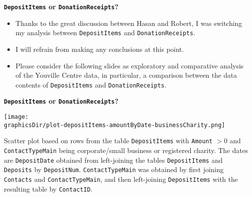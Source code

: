 
\begin{frame}{\bf\texttt{DepositItems} or \texttt{DonationReceipts}?}
\normalsize
\vskip 0.5cm

\begin{itemize}
\item	Thanks to the great discussion between Hasan and Robert, I was switching my analysis
	between \texttt{DepositItems} and \texttt{DonationReceipts}.

\vskip 0.5cm
\item	I will refrain from making any conclusions at this point.

\vskip 0.5cm
\item	Please consider the following slides as exploratory and comparative analysis of
	the Youville Centre data, in particular, a comparison between the data contents
	of \texttt{DepositItems} and \texttt{DonationReceipts}.

\end{itemize}
\end{frame}

\begin{frame}{\bf\texttt{DepositItems} or \texttt{DonationReceipts}?}
\tiny

\vskip 0.8cm
\begin{center}
\texttt{[image: \\graphicsDir/plot-depositItems-amountByDate-businessCharity.png]}
\end{center}

\begin{flushleft}
Scatter plot based on rows from the table \texttt{DepositItems} with {\color{red}\texttt{Amount} $> 0$}
and \texttt{ContactTypeMain} being corporate/small business or registered charity.
The dates are \texttt{DepositDate} obtained from left-joining the tables \texttt{DepositItems} and \texttt{Deposits} by \texttt{DepositNum}.
\texttt{ContactTypeMain} was obtained by first joining \texttt{Contacts} and \texttt{ContactTypeMain}, and then left-joining \texttt{DepositItems}
with the resulting table by \texttt{ContactID}.
\end{flushleft}
\end{frame}

